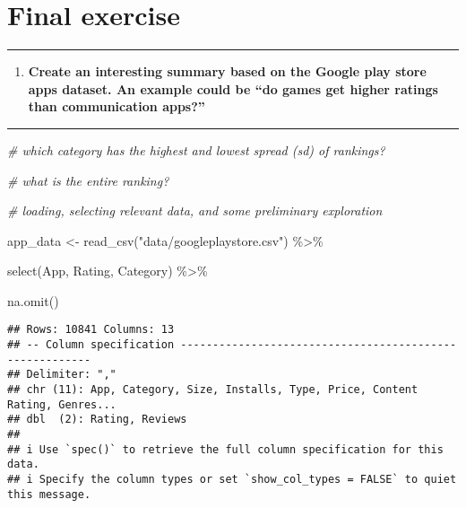 \documentclass[
]{article}
\newenvironment{Shaded}{\begin{snugshade}}{\end{snugshade}}
\newcommand{\CommentTok}[1]{\textcolor[rgb]{0.56,0.35,0.01}{\textit{#1}}}
\newcommand{\FunctionTok}[1]{\textcolor[rgb]{0.00,0.00,0.00}{#1}}
\newcommand{\NormalTok}[1]{#1}
\newcommand{\OtherTok}[1]{\textcolor[rgb]{0.56,0.35,0.01}{#1}}
\newcommand{\SpecialCharTok}[1]{\textcolor[rgb]{0.00,0.00,0.00}{#1}}
\newcommand{\StringTok}[1]{\textcolor[rgb]{0.31,0.60,0.02}{#1}}
\providecommand{\tightlist}{%
  \setlength{\itemsep}{0pt}\setlength{\parskip}{0pt}}
\begin{document}
\hypertarget{final-exercise}{%
\section{Final exercise}\label{final-exercise}}

\begin{center}\rule{0.5\linewidth}{0.5pt}\end{center}

\begin{enumerate}
\def\labelenumi{\arabic{enumi}.}
\setcounter{enumi}{19}
\tightlist
\item
  \textbf{Create an interesting summary based on the Google play store
  apps dataset. An example could be ``do games get higher ratings than
  communication apps?''}
\end{enumerate}

\begin{center}\rule{0.5\linewidth}{0.5pt}\end{center}

\begin{Shaded}
\begin{Highlighting}[]
\CommentTok{\# which category has the highest and lowest spread (sd) of rankings?}

\CommentTok{\# what is the entire ranking?}

\CommentTok{\# loading, selecting relevant data, and some preliminary exploration}

\NormalTok{app\_data }\OtherTok{\textless{}{-}} \FunctionTok{read\_csv}\NormalTok{(}\StringTok{"data/googleplaystore.csv"}\NormalTok{) }\SpecialCharTok{\%\textgreater{}\%}

  \FunctionTok{select}\NormalTok{(App, Rating, Category) }\SpecialCharTok{\%\textgreater{}\%}

  \FunctionTok{na.omit}\NormalTok{()}
\end{Highlighting}
\end{Shaded}

\begin{verbatim}
## Rows: 10841 Columns: 13
## -- Column specification --------------------------------------------------------
## Delimiter: ","
## chr (11): App, Category, Size, Installs, Type, Price, Content Rating, Genres...
## dbl  (2): Rating, Reviews
## 
## i Use `spec()` to retrieve the full column specification for this data.
## i Specify the column types or set `show_col_types = FALSE` to quiet this message.
\end{verbatim}
\end{document}
